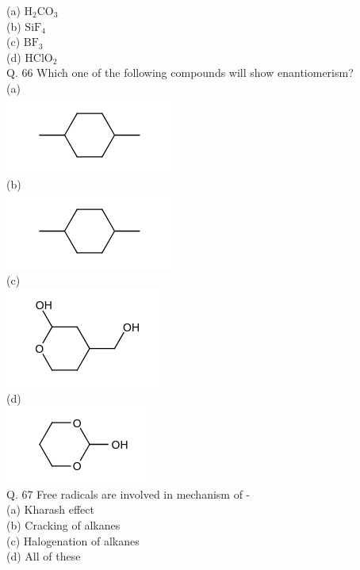\documentclass[10pt]{article}
\begin{document}
(a) $\mathrm{H}_{2} \mathrm{CO}_{3}$\\
(b) $\mathrm{SiF}_{4}$\\
(c) $\mathrm{BF}_{3}$\\
(d) $\mathrm{HClO}_{2}$\\
Q. 66 Which one of the following compounds will show enantiomerism?\\
(a)\\
\includegraphics{smile-026136b7dd6654caded9d0413a754773d21e4d1e}\\
(b)\\
\includegraphics{smile-8c4a6c0f3489377cb161e4d350f9e6e9a17dc0dd}\\
(c)\\
\includegraphics{smile-e02a4ba12243691c7a832d9716c3d621985fb2ae}\\
(d)\\
\includegraphics{smile-8a371951a8c7a7f74ef660f21f6c0621481329e0}\\
Q. 67 Free radicals are involved in mechanism of -\\
(a) Kharash effect\\
(b) Cracking of alkanes\\
(c) Halogenation of alkanes\\
(d) All of these\\
\end{document}
